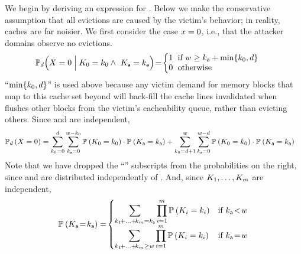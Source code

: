 We begin by deriving an expression
for \prob{\victimDemand}{\evictedNmbrRV = \evictedNmbr}.  Below we
make the conservative assumption that all evictions are caused by the
victim's behavior; in reality, caches are far noisier.  We first
consider the case $x=0$, i.e., that the attacker domains
observe no evictions.
\begin{align*}
\cprob{\Big}{\victimDemand}{\evictedNmbrRV =
0}{\linesPerContainerRV{0} = \linesPerContainer{0}
\wedge~\attackerLineNmbrRV =
\attackerLineNmbr}
& \!=\! \left\{\begin{array}{@{\extracolsep{-0.4em}}ll}
1 & \mbox{if $\cacheLineNmbr \ge \attackerLineNmbr + \min\{\linesPerContainer{0}, \victimDemand\}$} \\
0 & \mbox{otherwise}
\end{array}\right.
\end{align*}
``$\min\{k_{0}, d\}$'' is used above
because any victim demand for memory blocks that map to this cache set
beyond  will back-fill the cache lines invalidated
when \cachebar flushes other blocks from the victim's cacheability
queue, rather than evicting others.  Since  and
\attackerLineNmbrRV are independent,
\begin{align}
\mathbb{P}_{d}\left({X = 0}\right)
& = \sum_{k_{0}=0}^{d}
\sum_{k_{\mathsf{a}}=0}^{w-k_{0}}
\mathbb{P}_{}\left({K_{0} = k_{0}}\right) \cdot
\mathbb{P}_{}\left({K_{\mathsf{a}} = k_{\mathsf{a}}}\right)
 + \sum_{k_{0}=d+1}^{w} \sum_{k_{\mathsf{a}}=0}^{w-d} \mathbb{P}_{}\left({K_{0} = k_{0}}\right) \cdot \mathbb{P}_{}\left({K_{\mathsf{a}} = k_{\mathsf{a}}}\right) \label{eqn:zeroEvictions}
\end{align}
Note that we have dropped the ``\victimDemand'' subscripts from the
probabilities on the right, since 
and \attackerLineNmbrRV are distributed independently
of \victimDemand.  And, since
$K_{1},\ldots,K_{m}$
are independent,
\begin{align}
\prob{}{\attackerLineNmbrRV\!=\!\attackerLineNmbr} = \!\begin{cases}
\displaystyle
\sum_{ \linesPerContainer{1}\!+\ldots+\!\linesPerContainer{\attackerNmbr}=\attackerLineNmbr} \prod_{\containerIdx=1}^{\attackerNmbr} \prob{}{\linesPerContainerRV{\containerIdx} = \linesPerContainer{\containerIdx}} & \mbox{if $\attackerLineNmbr\!<\!\cacheLineNmbr$}\\
\displaystyle
\sum_{\linesPerContainer{1}\!+\ldots+\!\linesPerContainer{\attackerNmbr}\ge\cacheLineNmbr} \prod_{\containerIdx=1}^{\attackerNmbr} \prob{}{\linesPerContainerRV{\containerIdx} = \linesPerContainer{\containerIdx}} & \mbox{if $\attackerLineNmbr\!=\!\cacheLineNmbr$}
\end{cases}
\label{eqn:attackerLineNmbr}
\end{align}

